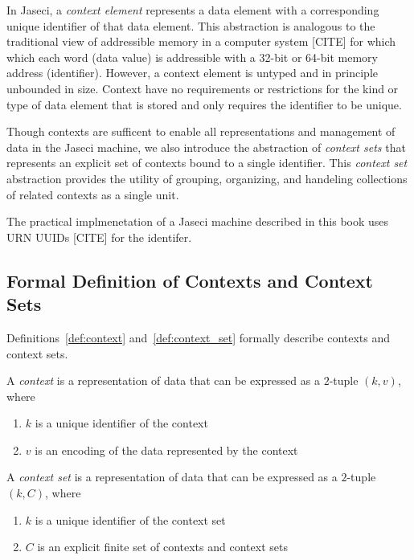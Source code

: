 In Jaseci, a \emph{context element} represents a data element with a corresponding unique identifier of that data element. This abstraction is analogous to the traditional view of addressible memory in a computer system [CITE] for which which each word (data value) is addressible with a 32-bit or 64-bit memory address (identifier). However, a context element is untyped and in principle unbounded in size. Context have no requirements or restrictions for the kind or type of data element that is stored and only requires the identifier to be unique.

Though contexts are sufficent to enable all representations and management of data in the Jaseci machine, we also introduce the abstraction of \emph{context sets} that represents an explicit set of contexts bound to a single identifier. This \emph{context set} abstraction provides the utility of grouping, organizing, and handeling collections of related contexts as a single unit.
\begin{remark}
    \begin{tBox}
        The practical implmenetation of a Jaseci machine described in this book uses URN UUIDs [CITE] for the identifer.
    \end{tBox}
\end{remark}

\subsection{Formal Definition of Contexts and Context Sets}

Definitions~\ref{def:context} and~\ref{def:context_set} formally describe contexts and context sets.

\begin{definition}[context]
    \label{def:context}
    A \emph{context} is a representation of data that can be expressed as a $2$-tuple $(k,v)$, where
    \begin{enumerate}
        \item $k$ is a unique identifier of the context
        \item $v$ is an encoding of the data represented by the context
    \end{enumerate}
\end{definition}

\begin{definition}
    \label{def:context_set}
    A \emph{context set} is a representation of data that can be expressed as a $2$-tuple $(k,C)$, where
    \begin{enumerate}
        \item $k$ is a unique identifier of the context set
        \item $C$ is an explicit finite set of contexts and context sets
    \end{enumerate}
\end{definition}



